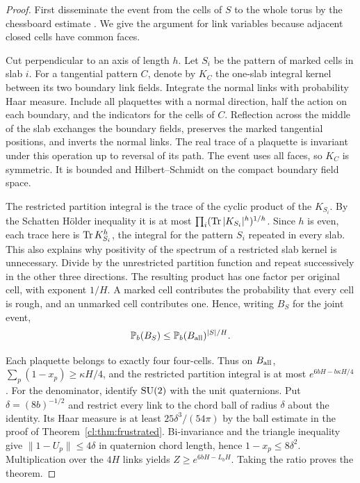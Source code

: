 \begin{proof}
First disseminate the event from the cells of $S$ to the whole torus by
the chessboard estimate \cite[Theorem~5.8]{Biskup09}. We give the argument
for link variables because adjacent closed cells have common faces.

Cut perpendicular to an axis of length $h$. Let $S_i$ be the pattern of
marked cells in slab $i$. For a tangential pattern $C$, denote by $K_C$
the one-slab integral kernel between its two boundary link fields.
Integrate the normal links with probability Haar measure. Include all
plaquettes with a normal direction, half the action on each boundary,
and the indicators for the cells of $C$. Reflection across the middle
of the slab exchanges the boundary fields, preserves the marked
tangential positions, and inverts the normal links. The real trace of a
plaquette is invariant under this operation up to reversal of its path.
The event uses all faces, so $K_C$ is symmetric. It is bounded and
Hilbert--Schmidt on the compact boundary field space.

The restricted partition integral is the trace of the cyclic product
of the $K_{S_i}$. By the Schatten H\"older inequality it is at most
$\prod_i(\operatorname{Tr} |K_{S_i}|^h)^{1/h}$. Since $h$ is even, each trace here is
$\operatorname{Tr} K_{S_i}^h$, the integral for the pattern $S_i$ repeated in every
slab. This also explains why positivity of the spectrum of a restricted
slab kernel is unnecessary. Divide by the unrestricted partition
function and repeat successively in the other three directions. The
resulting product has one factor per original cell, with exponent $1/H$.
A marked cell contributes the probability that every cell is rough, and
an unmarked cell contributes one. Hence, writing $B_S$ for the joint event,
\[
 {\mathbb P}_b(B_S)\le {\mathbb P}_b(B_{\rm all})^{|S|/H}.
\]

Each plaquette belongs to exactly four four-cells. Thus on $B_{\rm all}$,
$\sum_p(1-x_p)\ge\kappa H/4$, and the restricted partition integral
is at most $e^{6bH-b\kappa H/4}$. For the denominator, identify
$\mathrm{SU}(2)$ with the unit quaternions. Put $\delta=(8b)^{-1/2}$ and restrict
every link to the chord ball of radius $\delta$ about the identity.
Its Haar measure is at least $25\delta^3/(54\pi)$ by the ball estimate
in the proof of Theorem~\ref{cl:thm:frustrated}. Bi-invariance and the
triangle inequality give $\|1-U_p\|\le4\delta$ in quaternion chord length,
hence $1-x_p\le8\delta^2$. Multiplication over the $4H$ links yields
$Z\ge e^{6bH-L_b H}$. Taking the ratio proves the theorem.
\end{proof}

